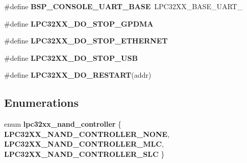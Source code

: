 \begin{DoxyCompactItemize}
\item 
\mbox{\label{group__RTEMSBSPsARMLPC32XX_ga079b62d123214293876069996b7665a6}} 
\#define {\bfseries B\+S\+P\+\_\+\+C\+O\+N\+S\+O\+L\+E\+\_\+\+U\+A\+R\+T\+\_\+\+B\+A\+SE}~L\+P\+C32\+X\+X\+\_\+\+B\+A\+S\+E\+\_\+\+U\+A\+R\+T\+\_
\item 
\#define {\bfseries L\+P\+C32\+X\+X\+\_\+\+D\+O\+\_\+\+S\+T\+O\+P\+\_\+\+G\+P\+D\+MA}
\item 
\#define {\bfseries L\+P\+C32\+X\+X\+\_\+\+D\+O\+\_\+\+S\+T\+O\+P\+\_\+\+E\+T\+H\+E\+R\+N\+ET}
\item 
\#define {\bfseries L\+P\+C32\+X\+X\+\_\+\+D\+O\+\_\+\+S\+T\+O\+P\+\_\+\+U\+SB}
\item 
\#define {\bfseries L\+P\+C32\+X\+X\+\_\+\+D\+O\+\_\+\+R\+E\+S\+T\+A\+RT}(addr)
\end{DoxyCompactItemize}
\subsection*{Enumerations}
\begin{DoxyCompactItemize}
\item 
\mbox{\label{group__RTEMSBSPsARMLPC32XX_gabe9642b841513dc3da498aeeb4d2beb9}} 
enum {\bfseries lpc32xx\+\_\+nand\+\_\+controller} \{ {\bfseries L\+P\+C32\+X\+X\+\_\+\+N\+A\+N\+D\+\_\+\+C\+O\+N\+T\+R\+O\+L\+L\+E\+R\+\_\+\+N\+O\+NE}, 
{\bfseries L\+P\+C32\+X\+X\+\_\+\+N\+A\+N\+D\+\_\+\+C\+O\+N\+T\+R\+O\+L\+L\+E\+R\+\_\+\+M\+LC}, 
{\bfseries L\+P\+C32\+X\+X\+\_\+\+N\+A\+N\+D\+\_\+\+C\+O\+N\+T\+R\+O\+L\+L\+E\+R\+\_\+\+S\+LC}
 \}
\end{DoxyCompactItemize}
